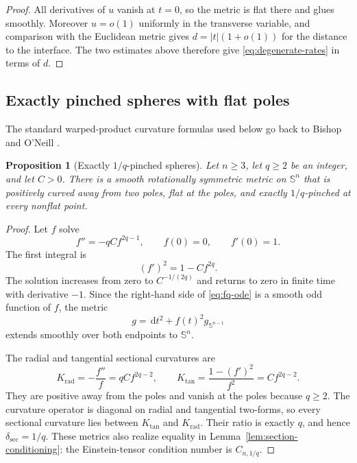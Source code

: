 \documentclass[11pt,reqno]{amsart}
\newtheorem{proposition}[theorem]{Proposition}
\theoremstyle{definition}
\theoremstyle{remark}
\newcommand{\dd}{\,\mathrm d}
\newcommand{\Sph}{\mathbb S}
\newcommand{\dsec}{\delta_{\mathrm{sec}}}
\newcommand{\abs}[1]{\lvert #1\rvert}
\begin{document}
\begin{proof}
All derivatives of $u$ vanish at $t=0$, so the metric is flat there and glues smoothly.  Moreover $u=o(1)$ uniformly in the transverse variable, and comparison with the Euclidean metric gives $d=\abs t(1+o(1))$ for the distance to the interface.  The two estimates above therefore give \eqref{eq:degenerate-rates} in terms of $d$.

\end{proof}

\subsection{Exactly pinched spheres with flat poles}

The standard warped-product curvature formulas used below go back to Bishop and O'Neill \cite{BishopONeill}.

\begin{proposition}[Exactly $1/q$-pinched spheres]\label{prop:pinched-spheres}
Let $n\ge3$, let $q\ge2$ be an integer, and let $C>0$.  There is a smooth rotationally symmetric metric on $\Sph^n$ that is positively curved away from two poles, flat at the poles, and exactly $1/q$-pinched at every nonflat point.
\end{proposition}

\begin{proof}
Let $f$ solve
\begin{equation}\label{eq:fq-ode}
f''=-qCf^{2q-1},
\qquad f(0)=0,
\qquad f'(0)=1.
\end{equation}
The first integral is
\begin{equation}\label{eq:fq-first}
(f')^2=1-Cf^{2q}.
\end{equation}
The solution increases from zero to $C^{-1/(2q)}$ and returns to zero in finite time with derivative $-1$.  Since the right-hand side of \eqref{eq:fq-ode} is a smooth odd function of $f$, the metric
\[
g=\dd t^2+f(t)^2g_{\Sph^{n-1}}
\]
extends smoothly over both endpoints to $\Sph^n$.

The radial and tangential sectional curvatures are
\[
K_{\mathrm{rad}}=-\frac{f''}{f}=qCf^{2q-2},
\qquad
K_{\mathrm{tan}}=\frac{1-(f')^2}{f^2}=Cf^{2q-2}.
\]
They are positive away from the poles and vanish at the poles because $q\ge2$.  The curvature operator is diagonal on radial and tangential two-forms, so every sectional curvature lies between $K_{\mathrm{tan}}$ and $K_{\mathrm{rad}}$.  Their ratio is exactly $q$, and hence $\dsec=1/q$.  These metrics also realize equality in Lemma~\ref{lem:section-conditioning}: the Einstein-tensor condition number is $C_{n,1/q}$.
\end{proof}
\end{document}

